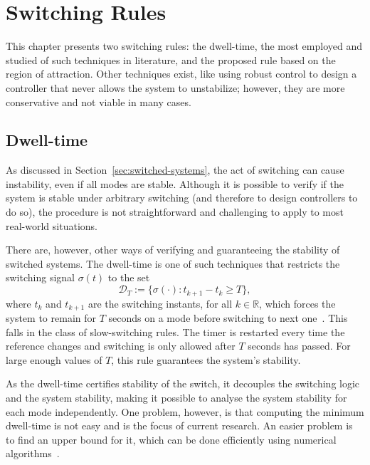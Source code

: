 
\chapter{Switching Rules}%
\label{chp:switching-rules}

This chapter presents two switching rules: the dwell-time, the most employed and
studied of such techniques in literature, and the proposed rule based on the
region of attraction. Other techniques exist, like using robust control to
design a controller that never allows the system to unstabilize; however, they
are more conservative and not viable in many cases.

\section{Dwell-time}%
\label{sec:dwell-time}

As discussed in Section~\ref{sec:switched-systems}, the act of switching can
cause instability, even if all modes are stable. Although it is possible to
verify if the system is stable under arbitrary switching (and therefore to
design controllers to do so), the procedure is not straightforward and
challenging to apply to most real-world situations.

There are, however, other ways of verifying and guaranteeing the stability of
switched systems. The dwell-time is one of such techniques that restricts the
switching signal \(\sigma{}(t)\) to the set
%
\begin{equation}
  \mathcal{D}_{T} := \{\sigma(\cdot):t_{k+1}-t_{k}\ge{}T\},
\end{equation}
%
where \(t_{k}\) and \(t_{k+1}\) are the switching instants, for all
\(k\in{}\mathbb{R}\), which forces the system to remain for \(T\) seconds on a
mode before switching to next one~\parencite{colaneri:dwell}. This falls in the
class of slow-switching rules. The timer is restarted every time the reference
changes and switching is only allowed after \(T\) seconds has passed. For large
enough values of \(T\), this rule guarantees the system's stability.

As the dwell-time certifies stability of the switch, it decouples the switching
logic and the system stability, making it possible to analyse the system
stability for each mode independently. One problem, however, is that computing
the minimum dwell-time is not easy and is the focus of current research. An
easier problem is to find an upper bound for it, which can be done efficiently
using numerical algorithms~\parencite{colaneri:dwell}.

